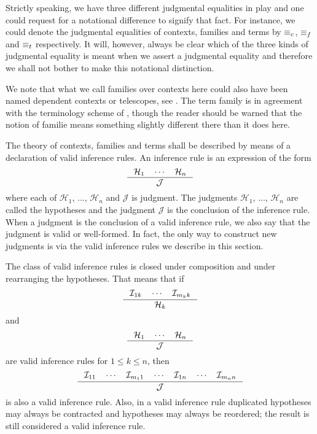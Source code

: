 Strictly speaking, we have three different judgmental equalities in play and one
could request for a notational difference to signify that fact. For instance,
we could denote the judgmental equalities of contexts, families and terms by
$\equiv_c$, $\equiv_f$ and $\equiv_t$ respectively. It will, however, always be
clear which of the three kinds of judgmental equality is meant when we assert
a judgmental equality and therefore we shall not bother to make this notational
distinction.

We note that what we call families over contexts
here could also have been named dependent contexts or telescopes, see
\cite{deBruijn1991,hofmann1995extensional}. The term family is in agreement
with the terminology scheme of \cite{TheBook}, though the reader should be
warned that the notion of familie means something slightly different there than
it does here.

The theory of contexts, families and terms shall be described by means of a
declaration of valid inference rules. An inference rule is an expression of the
form
\begin{equation*}
\inference{\mathcal{H}_1\quad\cdots\quad\mathcal{H}_n}{\mathcal{J}}
\end{equation*}
where each of $\mathcal{H}_1$, ..., $\mathcal{H}_n$ and $\mathcal{J}$ is 
judgment. The judgments $\mathcal{H}_1$, ..., $\mathcal{H}_n$ are called the
hypotheses and the judgment $\mathcal{J}$ is the conclusion of the inference
rule. When a judgment is the conclusion of a valid inference rule, we also say
that the judgment is valid or well-formed. In fact, the only way to construct
new judgments is via the valid inference rules we describe in this section.

The class of valid inference rules is closed under composition and under
rearranging the hypotheses. That
means that if
\begin{equation*}
\inference{\mathcal{I}_{1k}\quad\cdots\quad\mathcal{I}_{m_kk}}{\mathcal{H}_k}
\end{equation*}
and
\begin{equation*}
\inference{\mathcal{H}_1\quad\cdots\quad\mathcal{H}_n}{\mathcal{J}}
\end{equation*}
are valid inference rules for $1\leq k\leq n$, then
\begin{equation*}
\inference{\mathcal{I}_{11}\quad\cdots\quad\mathcal{I}_{m_11}\quad\cdots\quad\mathcal{I}_{1n}\quad\cdots\quad\mathcal{I}_{m_nn}}{\mathcal{J}}
\end{equation*}
is also a valid inference rule. Also, in a valid inference rule 
duplicated hypotheses may always be contracted and hypotheses may always be 
reordered; the result is still considered a valid inference rule.

